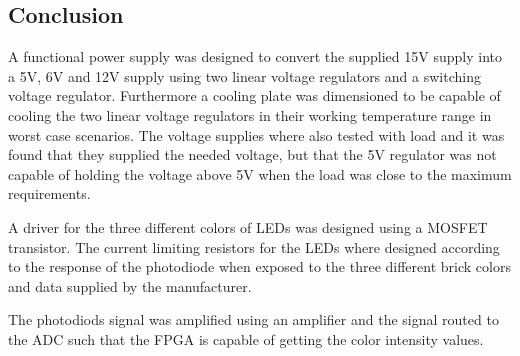 
\subsection{Conclusion}
A functional power supply was designed to convert the supplied 15V supply into a 5V, 6V and 12V supply using two linear voltage regulators and a switching voltage regulator.
Furthermore a cooling plate was dimensioned to be capable of cooling the two linear voltage regulators in their working temperature range in worst case scenarios.
The voltage supplies where also tested with load and it was found that they supplied the needed voltage, but that the 5V regulator was not capable of holding the voltage above 5V when the load was close to the maximum requirements.

A driver for the three different colors of LEDs was designed using a MOSFET transistor.
The current limiting resistors for the LEDs where designed according to the response of the photodiode when exposed to the three different brick colors and data supplied by the manufacturer.

The photodiods signal was amplified using an amplifier and the signal routed to the ADC such that the FPGA is capable of getting the color intensity values.


